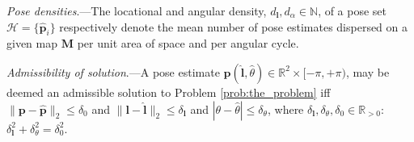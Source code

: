 \begin{definition}
  \label{def:definition_6} \textit{Pose densities}.---The locational and
  angular density, $d_{\bm{l}}, d_{\alpha} \in \mathbb{N}$, of a pose set
  $\mathcal{H} = \{\hat{\bm{p}}_i\}$ respectively denote the mean number of
  pose estimates dispersed on a given map $\bm{M}$ per unit area of space and
  per angular cycle.
\end{definition}

\begin{definition}
  \label{def:definition_7} \textit{Admissibility of solution}.---A pose estimate
  $\hat{\bm{p}}(\hat{\bm{l}},\hat{\theta}) \in \mathbb{R}^2 \times [-\pi,+\pi)$,
  may be deemed an admissible solution to Problem \ref{prob:the_problem} iff
  $\|\bm{p}-\hat{\bm{p}}\|_2 \leq \delta_0$ and
  $\|\bm{l}-\hat{\bm{l}}\|_2 \leq \delta_{\bm{l}}$ and
  $|\theta-\hat{\theta}| \leq \delta_\theta$, where
  $\delta_{\bm{l}}, \delta_\theta, \delta_0 \in \mathbb{R}_{> 0}$:
  $\delta_{\bm{l}}^2 + \delta_{\theta}^2 = \delta_0^2$.
\end{definition}

